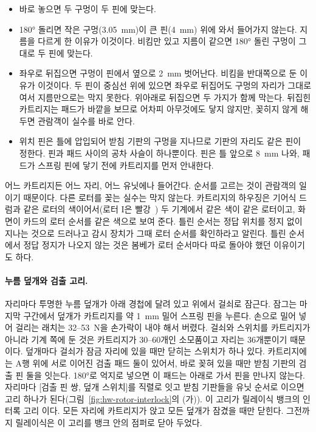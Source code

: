 \begin{itemize}
\item 바로 놓으면 두 구멍이 두 핀에 맞는다.
\item 180° 돌리면 작은 구멍(3.05~mm)이 큰 핀(4~mm) 위에 와서 들어가지 않는다. 지름을 다르게 한 이유가 이것이다.
비킴만 있고 지름이 같으면 180° 돌린 구멍이 그대로 두 핀에 맞는다.
\item 좌우로 뒤집으면 구멍이 핀에서 옆으로 2~mm 벗어난다. 비킴을 반대쪽으로 둔 이유가 이것이다. 두 핀이 중심선
위에 있으면 좌우로 뒤집어도 구멍의 자리가 그대로여서 지름만으로는 막지 못한다. 위아래로 뒤집으면 두 가지가
함께 막는다. 뒤집힌 카트리지는 패드가 바깥을 보므로 어차피 아무것에도 닿지 않지만, 꽂히지 않게 해 두면 관람객이
실수를 바로 안다.
\item 위치 핀은 틀에 압입되어 받침 기판의 구멍을 지나므로 기판의 자리도 같은 핀이 정한다. 핀과 패드 사이의 공차
사슬이 하나뿐이다. 핀은 틀 앞으로 8~mm 나와, 패드가 스프링 핀에 닿기 전에 카트리지를 먼저 안내한다.
\end{itemize}

어느 카트리지든 어느 자리, 어느 유닛에나 들어간다. 순서를 고르는 것이 관람객의 일이기 때문이다. 다른 로터를
꽂는 실수는 막지 않는다. 카트리지의 하우징은 기어식 드럼과 같은 로터의 색이어서(로터 I은 빨강~\cite[9]{us6812report1944})
두 기계에서 같은 색이 같은 로터이고, 화면이 카드의 로터 순서를 같은 색으로 보여 준다. 틀린 순서는 정답 위치를 정지
없이 지나는 것으로 드러나고 감시 장치가 그때 로터 순서를 확인하라고 알린다. 틀린 순서에서 정답 정지가 나오지
않는 것은 봄베가 로터 순서마다 따로 돌아야 했던 이유이기도 하다.

\paragraph{누름 덮개와 검출 고리.} 자리마다 투명한 누름 덮개가 아래 경첩에 달려 있고 위에서 걸쇠로 잠근다. 잠그는
마지막 구간에서 덮개가 카트리지를 약 1~mm 밀어 스프링 핀을 누른다. 손으로 밀어 넣어 걸리는 래치는 32--53~N을
손가락이 내야 해서 버렸다. 걸쇠와 스위치를 카트리지가 아니라 기계 쪽에 둔 것은 카트리지가 30--60개인 소모품이고
자리는 36개뿐이기 때문이다. 덮개마다 걸쇠가 잠금 자리에 있을 때만 닫히는 스위치가 하나 있다. 카트리지에는 A행
위에 서로 이어진 검출 패드 둘이 있어서, 바로 꽂혀 있을 때만 받침 기판의 검출 핀 둘을 잇는다. 180°로 억지로 넣으면
이 패드는 아래로 가서 핀을 만나지 않는다. 자리마다 [검출 핀 쌍, 덮개 스위치]를 직렬로 잇고 받침 기판들을 유닛
순서로 이으면 고리 하나가 된다(그림~\ref{fig:hw-rotor-interlock}의 (가)). 이 고리가 릴레이식 뱅크의 인터록 고리
이다. 모든 자리에 카트리지가 앉고 모든 덮개가 잠겼을 때만 닫힌다. 그전까지 릴레이식은 이 고리를 뱅크 안의
점퍼로 닫아 두었다.

